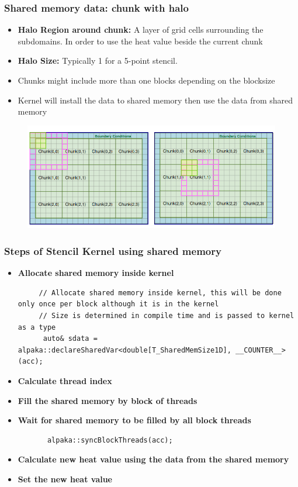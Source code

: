 \documentclass[9pt]{beamer}
\begin{document}
\begin{frame}
\frametitle{Shared memory data: chunk with halo}
\begin{itemize}
    \item \textbf{Halo Region around chunk:} A layer of grid cells surrounding the subdomains. In order to use the heat value beside the current chunk
    \item \textbf{Halo Size:} Typically 1 for a 5-point stencil.
    \item Chunks might include more than one blocks depending on the blocksize
    \item Kernel will install the data to shared memory then use the data from shared memory
\end{itemize}

\begin{figure}
    \centering
    \includegraphics[width=0.8\linewidth]{Screenshot from 2024-08-30 19-03-50.png}
    \label{fig:enter-label}
\end{figure}
\end{frame}

\begin{frame}[fragile]
\frametitle{Steps of Stencil Kernel using shared memory}
\begin{itemize}
    \item \textbf{Allocate shared memory inside kernel}
   \lstset{basicstyle=\ttfamily\scriptsize}
     \begin{lstlisting}
     // Allocate shared memory inside kernel, this will be done only once per block although it is in the kernel
     // Size is determined in compile time and is passed to kernel as a type
      auto& sdata = alpaka::declareSharedVar<double[T_SharedMemSize1D], __COUNTER__>(acc);
        \end{lstlisting}
 \item \textbf{Calculate thread index}
  \item \textbf{Fill the shared memory by block of threads}
 \item \textbf{Wait for shared memory to be filled by all block threads}
 \begin{lstlisting}
       alpaka::syncBlockThreads(acc);
   \end{lstlisting}
 \item \textbf{Calculate new heat value using the data from the shared memory}
 \item \textbf{Set the new heat value}
 \end{itemize}
\end{frame}
\end{document}
